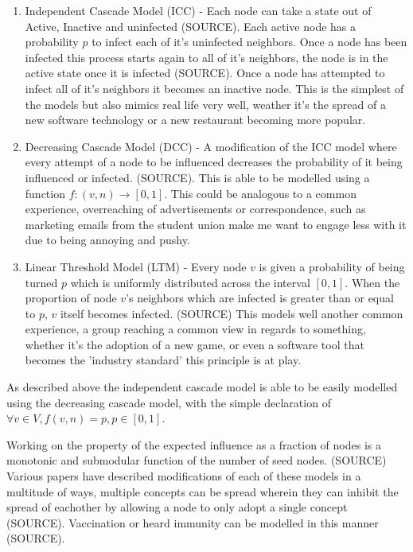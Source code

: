 \documentclass{article}
\begin{document}
\begin{enumerate}
	\item Independent Cascade Model (ICC) - Each node can take a state out of Active, Inactive and uninfected (SOURCE).
	      Each active node has a probability $p$ to infect each of it's uninfected neighbors.
	      Once a node has been infected this process starts again to all of it's neighbors, the node is in the active state once it is infected (SOURCE).
	      Once a node has attempted to infect all of it's neighbors it becomes an inactive node.
	      This is the simplest of the models but also mimics real life very well, weather it's the spread of a new software technology or a new restaurant becoming more popular.
	\item Decreasing Cascade Model (DCC) - A modification of the ICC model where every attempt of a node to be influenced decreases the probability of it being influenced or infected. (SOURCE).
	      This is able to be modelled using a function $f: (v, n) \to [0, 1]$.
	      This could be analogous to a common experience, overreaching of advertisements or correspondence, such as marketing emails from the student union make me want to engage less with it due to being annoying and pushy.
	\item Linear Threshold Model (LTM) - Every node $v$ is given a probability of being turned $p$ which is uniformly distributed across the interval $[0, 1]$. When the proportion of node $v$'s neighbors which are infected is greater than or equal to $p$, $v$ itself becomes infected. (SOURCE)
	      This models well another common experience, a group reaching a common view in regards to something, whether it's the adoption of a new game, or even a software tool that becomes the 'industry standard' this principle is at play.
\end{enumerate}

As described above the independent cascade model is able to be easily modelled using the decreasing cascade model,
with the simple declaration of $\forall v \in V, f(v, n) = p, p \in [0, 1]$.

Working on the property of the expected influence as a fraction of nodes is a monotonic and submodular function of the number of seed nodes. (SOURCE)
\\

Various papers have described modifications of each of these models in a multitude of ways,
multiple concepts can be spread wherein they can inhibit the spread of eachother by allowing a node to only adopt a single concept (SOURCE).
Vaccination or heard immunity can be modelled in this manner (SOURCE).
\end{document}
